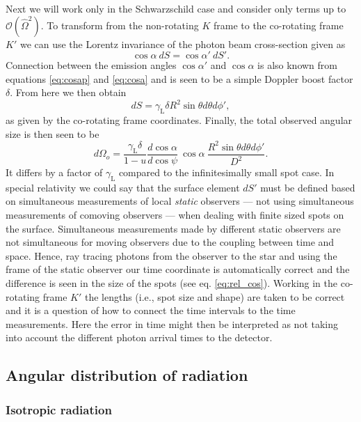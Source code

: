\documentclass{aa}
\newcommand{\be}{\begin{equation}}
\newcommand{\ee}{\end{equation}}
\newcommand{\sch}{Schwarzschild }
\newcommand{\Ob}{\ensuremath{\hat{\Omega}}}
\newcommand{\lgamma}{\gamma_{\text{L}}}
\begin{document}
Next we will work only in the \sch case and consider only terms up to $\mathcal{O}(\Ob^2)$.
To transform from the non-rotating $K$ frame to the co-rotating frame $K'$ we can use the Lorentz invariance of the photon beam cross-section given as \citep{Terrell60, LB85}
\be
\cos\alpha ~dS = \cos\alpha' ~dS'.
\ee
Connection between the emission angles $\cos\alpha'$ and $\cos\alpha$ is also known from equations \eqref{eq:cosap} and \eqref{eq:cosa} and is seen to be a simple Doppler boost factor $\delta$.
From here we then obtain
\be
dS = \lgamma \delta R^2 \sin\theta d\theta d\phi',
\ee
as given by the co-rotating frame coordinates.
Finally, the total observed angular size is then seen to be 
\be
d\Omega_o = \frac{\lgamma \delta}{1-u} \frac{d \cos\alpha}{d \cos\psi} ~\cos\alpha ~ \frac{R^2 \sin\theta d\theta d\phi'}{D^2}.
\ee
It differs by a factor of $\lgamma$ compared to the infinitesimally small spot case.
In special relativity we could say that the surface element $dS'$ must be defined based on simultaneous measurements of local \textit{static} observers --- not using simultaneous measurements of comoving observers --- when dealing with finite sized spots on the surface.
Simultaneous measurements made by different static observers are not simultaneous for moving observers due to the coupling between time and space.
Hence, ray tracing photons from the observer to the star and using the frame of the static observer our time coordinate is automatically correct and the difference is seen in the size of the spots (see eq. \ref{eq:rel_cos}).
Working in the co-rotating frame $K'$ the lengths (i.e., spot size and shape) are taken to be correct and it is a question of how to connect the time intervals to the time measurements.
Here the error in time might then be interpreted as not taking into account the different photon arrival times to the detector.


\subsection{Angular distribution of radiation}\label{sect:angular_distr}
\subsubsection{Isotropic radiation}
\end{document}
